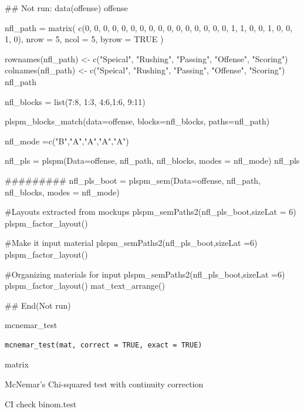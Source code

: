 \documentclass[a4paper]{book}
\begin{document}
\begin{Examples}
\begin{ExampleCode}
## Not run: 
data(offense)
offense %

nfl_path = matrix(
  c(0, 0, 0, 0, 0,
    0, 0, 0, 0, 0,
    0, 0, 0, 0, 0,
    0, 1, 1, 0, 0,
    1, 0, 0, 1, 0),
  nrow = 5, ncol = 5, byrow = TRUE )

rownames(nfl_path) <- c("Speical", "Rushing", "Passing", "Offense", "Scoring")
colnames(nfl_path) <- c("Speical", "Rushing", "Passing", "Offense", "Scoring")
nfl_path

nfl_blocks = list(7:8, 1:3, 4:6,1:6, 9:11)

plspm_blocks_match(data=offense, blocks=nfl_blocks,
                   paths=nfl_path)

nfl_mode =c("B","A","A","A","A")

nfl_pls = plspm(Data=offense, nfl_path, nfl_blocks, modes = nfl_mode)
nfl_pls%

#########
nfl_pls_boot = plspm_sem(Data=offense, nfl_path, nfl_blocks, modes = nfl_mode)

#Layouts extracted from mockups
plspm_semPaths2(nfl_pls_boot,sizeLat = 6)%
  plspm_factor_layout()

#Make it input material
plspm_semPaths2(nfl_pls_boot,sizeLat =6)%
  plspm_factor_layout() %

#Organizing materials for input
plspm_semPaths2(nfl_pls_boot,sizeLat =6)%
  plspm_factor_layout() %
  mat_text_arrange()

## End(Not run)

\end{ExampleCode}
\end{Examples}
%
\begin{Description}
mcnemar\_test
\end{Description}
%
\begin{Usage}
\begin{verbatim}
mcnemar_test(mat, correct = TRUE, exact = TRUE)
\end{verbatim}
\end{Usage}
%
\begin{Arguments}
\begin{ldescription}
\item[\code{mat}] matrix

\item[\code{correct}] McNemar's Chi-squared test with continuity correction

\item[\code{exact}] CI check binom.test
\end{ldescription}
\end{Arguments}
\end{document}
